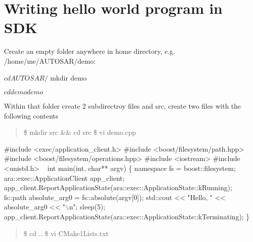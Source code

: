 \section*{Writing hello world program in S\+DK}


\begin{DoxyEnumerate}
\item Create an empty folder anywhere in home directory, e.\+g. /home/me/\+A\+U\+T\+O\+S\+A\+R/demo\+:
\end{DoxyEnumerate}


\begin{DoxyCode}
$ cd AUTOSAR/

$ mkdir demo

$ cd demo

demo$
\end{DoxyCode}



\begin{DoxyEnumerate}
\item Within that folder create 2 subdirectroy files and src, create two files with the following contents \begin{quote}
\$ mkdir src \&\& cd src \$ vi demo.\+cpp \end{quote}

\end{DoxyEnumerate}


\begin{DoxyCode}
#include <exec/application\_client.h>
#include <boost/filesystem/path.hpp>
#include <boost/filesystem/operations.hpp>
#include <iostream>
#include <unistd.h>
 
int main(int, char** argv)
\{
    namespace fs = boost::filesystem;
 
    ara::exec::ApplicationClient app\_client;
    app\_client.ReportApplicationState(ara::exec::ApplicationState::kRunning);
 
    fs::path absolute\_arg0 = fs::absolute(argv[0]);
    std::cout << "Hello, " << absolute\_arg0 << "\(\backslash\)n";
    sleep(5);
 
    app\_client.ReportApplicationState(ara::exec::ApplicationState::kTerminating);
\}
\end{DoxyCode}
 \begin{quote}
\$ cd .. \$ vi C\+Make1\+Lists.\+txt \end{quote}



